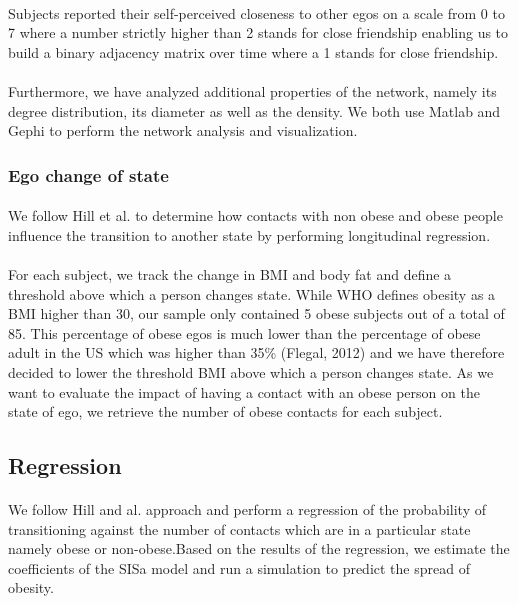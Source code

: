 \documentclass[11pt]{article}
\begin{document}
\paragraph{}
Subjects reported their self-perceived closeness to other egos on a scale from 0 to 7 where a number strictly higher than 2 stands for close friendship enabling us to build a binary adjacency matrix over time where a 1 stands for close friendship.

\paragraph{}

Furthermore, we have analyzed additional properties of the network, namely its degree distribution, its diameter as well as the density. We both use Matlab and Gephi to perform the network analysis and visualization.

\subsubsection{Ego change of state}
\paragraph{}
We follow Hill et al. to determine how contacts with non obese and obese people influence the transition to another state by performing longitudinal regression. 
\paragraph{}
For each subject, we track the change in BMI and body fat and define a threshold above which a person changes state. While WHO defines obesity as a BMI higher than 30, our sample only contained 5 obese subjects out of a total of 85. This percentage of obese egos is much lower than the percentage of obese adult in the US which was higher than 35\% (Flegal, 2012) and we have therefore decided to lower the threshold BMI above which a person changes state. As we want to evaluate the impact of having a contact with an obese person  on the state of ego, we retrieve the number of obese contacts for each subject.

\subsection{Regression}
\paragraph{}
We follow Hill and al. approach and perform a regression of the probability of transitioning against the number of contacts which are in a particular state namely obese or non-obese.Based on the results of the regression, we estimate the coefficients of the SISa model and run a simulation to predict the spread of obesity.
\end{document}
